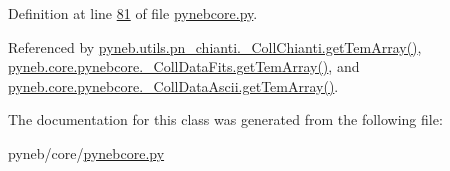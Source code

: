 Definition at line \hyperlink{pynebcore_8py_source_l00081}{81} of file \hyperlink{pynebcore_8py_source}{pynebcore.\-py}.



Referenced by \hyperlink{pn__chianti_8py_source_l00551}{pyneb.\-utils.\-pn\-\_\-chianti.\-\_\-\-Coll\-Chianti.\-get\-Tem\-Array()}, \hyperlink{pynebcore_8py_source_l00897}{pyneb.\-core.\-pynebcore.\-\_\-\-Coll\-Data\-Fits.\-get\-Tem\-Array()}, and \hyperlink{pynebcore_8py_source_l01129}{pyneb.\-core.\-pynebcore.\-\_\-\-Coll\-Data\-Ascii.\-get\-Tem\-Array()}.



The documentation for this class was generated from the following file\-:\begin{DoxyCompactItemize}
\item 
pyneb/core/\hyperlink{pynebcore_8py}{pynebcore.\-py}\end{DoxyCompactItemize}
